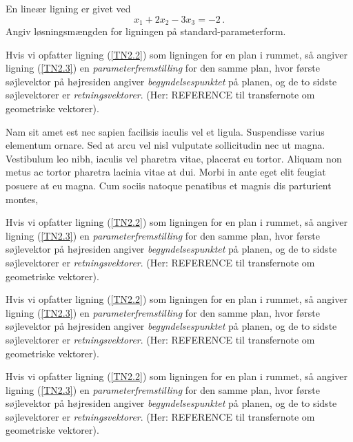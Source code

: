 \begin{theorem}

En lineær ligning er givet ved
\begin{equation}
x_1+2x_2-3x_3=-2\,.
\end{equation}
Angiv løsningsmængden for ligningen på standard-parameterform.


\begin{obs}
Hvis vi opfatter ligning (\ref{TN2.2}) som ligningen for en plan i rummet, så angiver ligning (\ref{TN2.3}) en \textit{parameterfremstilling} for den samme plan, hvor første søjlevektor på højresiden angiver \textit{begyndelsespunktet} på planen, og de to sidste søjlevektorer er \textit{retningsvektorer}. (Her: REFERENCE til transfernote om geometriske vektorer).
\end{obs}

Nam sit amet est nec sapien facilisis iaculis vel et ligula. Suspendisse varius elementum ornare. Sed at arcu vel nisl vulputate sollicitudin nec ut magna. Vestibulum leo nibh, iaculis vel pharetra vitae, placerat eu tortor. Aliquam non metus ac tortor pharetra lacinia vitae at dui. Morbi in ante eget elit feugiat posuere at eu magna. Cum sociis natoque penatibus et magnis dis parturient montes,

\begin{info}
Hvis vi opfatter ligning (\ref{TN2.2}) som ligningen for en plan i rummet, så angiver ligning (\ref{TN2.3}) en \textit{parameterfremstilling} for den samme plan, hvor første søjlevektor på højresiden angiver \textit{begyndelsespunktet} på planen, og de to sidste søjlevektorer er \textit{retningsvektorer}. (Her: REFERENCE til transfernote om geometriske vektorer).
\end{info}



\begin{think}
Hvis vi opfatter ligning (\ref{TN2.2}) som ligningen for en plan i rummet, så angiver ligning (\ref{TN2.3}) en \textit{parameterfremstilling} for den samme plan, hvor første søjlevektor på højresiden angiver \textit{begyndelsespunktet} på planen, og de to sidste søjlevektorer er \textit{retningsvektorer}. (Her: REFERENCE til transfernote om geometriske vektorer).
\end{think}



\begin{aha}
Hvis vi opfatter ligning (\ref{TN2.2}) som ligningen for en plan i rummet, så angiver ligning (\ref{TN2.3}) en \textit{parameterfremstilling} for den samme plan, hvor første søjlevektor på højresiden angiver \textit{begyndelsespunktet} på planen, og de to sidste søjlevektorer er \textit{retningsvektorer}. (Her: REFERENCE til transfernote om geometriske vektorer).
\end{aha}



\end{theorem}
